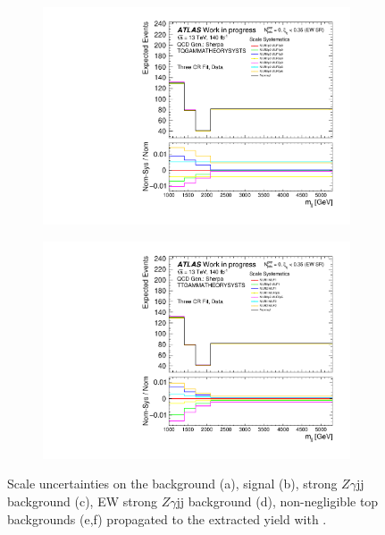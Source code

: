 \begin{figure}[t]
\begin{subfigure}[b]{0.49\textwidth}
    \includegraphics[width=\textwidth]{plots/diffx/scalesysts/data/mjj_QCD_Sh2211_TQGAMMATHEORYSYSTS_3cr_Scale_0p01sigma_allvariations.pdf}
    \caption{}
  \end{subfigure}
  \hfill
  \begin{subfigure}[b]{0.49\textwidth}
    \centering
    \includegraphics[width=\textwidth]{plots/diffx/scalesysts/data/mjj_QCD_Sh2211_TTGAMMATHEORYSYSTS_3cr_Scale_0p01sigma_allvariations.pdf}
    \caption{}
  \end{subfigure}
  \caption{Scale uncertainties on the \qcdwy background (a), \ewwy signal (b), strong $Z\gamma$jj background (c), EW strong $Z\gamma$jj background (d), non-negligible top backgrounds (e,f) propagated to the extracted \ewwy yield with \mjj. \label{fig:vbswy:scaledata}}
\end{figure}

